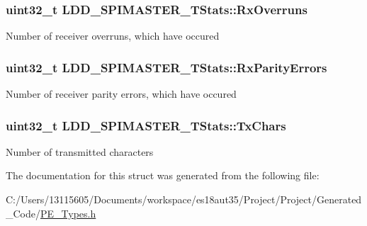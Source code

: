 \subsubsection[{Rx\+Overruns}]{\setlength{\rightskip}{0pt plus 5cm}uint32\+\_\+t L\+D\+D\+\_\+\+S\+P\+I\+M\+A\+S\+T\+E\+R\+\_\+\+T\+Stats\+::\+Rx\+Overruns}\label{struct_l_d_d___s_p_i_m_a_s_t_e_r___t_stats_a528cf1d78c49b42ae455ba895987ece5}
Number of receiver overruns, which have occured \hypertarget{struct_l_d_d___s_p_i_m_a_s_t_e_r___t_stats_a83f9f4b7598e6d84e6842539cc54619f}{}
\subsubsection[{Rx\+Parity\+Errors}]{\setlength{\rightskip}{0pt plus 5cm}uint32\+\_\+t L\+D\+D\+\_\+\+S\+P\+I\+M\+A\+S\+T\+E\+R\+\_\+\+T\+Stats\+::\+Rx\+Parity\+Errors}\label{struct_l_d_d___s_p_i_m_a_s_t_e_r___t_stats_a83f9f4b7598e6d84e6842539cc54619f}
Number of receiver parity errors, which have occured \hypertarget{struct_l_d_d___s_p_i_m_a_s_t_e_r___t_stats_af5376883e99d71f857999d58b2888f95}{}
\subsubsection[{Tx\+Chars}]{\setlength{\rightskip}{0pt plus 5cm}uint32\+\_\+t L\+D\+D\+\_\+\+S\+P\+I\+M\+A\+S\+T\+E\+R\+\_\+\+T\+Stats\+::\+Tx\+Chars}\label{struct_l_d_d___s_p_i_m_a_s_t_e_r___t_stats_af5376883e99d71f857999d58b2888f95}
Number of transmitted characters 

The documentation for this struct was generated from the following file\+:\begin{DoxyCompactItemize}
\item 
C\+:/\+Users/13115605/\+Documents/workspace/es18aut35/\+Project/\+Project/\+Generated\+\_\+\+Code/\hyperlink{_p_e___types_8h}{P\+E\+\_\+\+Types.\+h}\end{DoxyCompactItemize}
